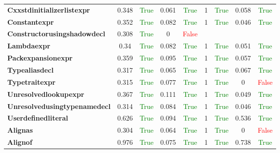 \documentclass{article}
\begin{document}
\begin{xltabular}{\textwidth}{lcccccccc}
\textbf{{\fontsize{10}{12}\selectfont Cxxstdinitializerlistexpr}}& 0.348&\textcolor{green}{True}& 0.061&\textcolor{green}{True}& 1&\textcolor{green}{True}& 0.058&\textcolor{green}{True} \\[0.5ex]
\textbf{{\fontsize{10}{12}\selectfont Constantexpr}}& 0.352&\textcolor{green}{True}& 0.082&\textcolor{green}{True}& 1&\textcolor{green}{True}& 0.046&\textcolor{green}{True} \\[0.5ex]
\textbf{{\fontsize{10}{12}\selectfont Constructorusingshadowdecl}}& 0.308&\textcolor{green}{True}& 0&\textcolor{red}{False} \\[0.5ex]
\textbf{{\fontsize{10}{12}\selectfont Lambdaexpr}}& 0.34&\textcolor{green}{True}& 0.082&\textcolor{green}{True}& 1&\textcolor{green}{True}& 0.051&\textcolor{green}{True} \\[0.5ex]
\textbf{{\fontsize{10}{12}\selectfont Packexpansionexpr}}& 0.359&\textcolor{green}{True}& 0.095&\textcolor{green}{True}& 1&\textcolor{green}{True}& 0.057&\textcolor{green}{True} \\[0.5ex]
\textbf{{\fontsize{10}{12}\selectfont Typealiasdecl}}& 0.317&\textcolor{green}{True}& 0.065&\textcolor{green}{True}& 1&\textcolor{green}{True}& 0.067&\textcolor{green}{True} \\[0.5ex]
\textbf{{\fontsize{10}{12}\selectfont Typetraitexpr}}& 0.315&\textcolor{green}{True}& 0.077&\textcolor{green}{True}& 1&\textcolor{green}{True}& 0&\textcolor{red}{False} \\[0.5ex]
\textbf{{\fontsize{10}{12}\selectfont Unresolvedlookupexpr}}& 0.367&\textcolor{green}{True}& 0.111&\textcolor{green}{True}& 1&\textcolor{green}{True}& 0.049&\textcolor{green}{True} \\[0.5ex]
\textbf{{\fontsize{10}{12}\selectfont Unresolvedusingtypenamedecl}}& 0.314&\textcolor{green}{True}& 0.084&\textcolor{green}{True}& 1&\textcolor{green}{True}& 0.046&\textcolor{green}{True} \\[0.5ex]
\textbf{{\fontsize{10}{12}\selectfont Userdefinedliteral}}& 0.626&\textcolor{green}{True}& 0.094&\textcolor{green}{True}& 1&\textcolor{green}{True}& 0.536&\textcolor{green}{True} \\[0.5ex]
\textbf{{\fontsize{10}{12}\selectfont Alignas}}& 0.304&\textcolor{green}{True}& 0.064&\textcolor{green}{True}& 1&\textcolor{green}{True}& 0&\textcolor{red}{False} \\[0.5ex]
\textbf{{\fontsize{10}{12}\selectfont Alignof}}& 0.976&\textcolor{green}{True}& 0.075&\textcolor{green}{True}& 1&\textcolor{green}{True}& 0.738&\textcolor{green}{True} \\[0.5ex]

\end{xltabular}
\end{document}
